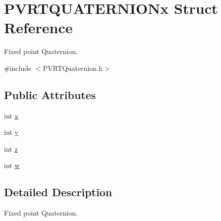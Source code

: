 \hypertarget{struct_p_v_r_t_q_u_a_t_e_r_n_i_o_nx}{\section{P\+V\+R\+T\+Q\+U\+A\+T\+E\+R\+N\+I\+O\+Nx Struct Reference}
\label{struct_p_v_r_t_q_u_a_t_e_r_n_i_o_nx}
}


Fixed point Quaternion.  




{\ttfamily \#include $<$P\+V\+R\+T\+Quaternion.\+h$>$}

\subsection*{Public Attributes}
\begin{DoxyCompactItemize}
\item 
int \hyperlink{struct_p_v_r_t_q_u_a_t_e_r_n_i_o_nx_af3450d5759032c0a58d958f8ab855512}{x}
\item 
int \hyperlink{struct_p_v_r_t_q_u_a_t_e_r_n_i_o_nx_a58e6084d1feeefad2f2348d0d1070afc}{y}
\item 
int \hyperlink{struct_p_v_r_t_q_u_a_t_e_r_n_i_o_nx_af011f90cdefb40164d85c19be4c193ae}{z}
\item 
int \hyperlink{struct_p_v_r_t_q_u_a_t_e_r_n_i_o_nx_af6943db18421e74d91f9abf6de235507}{w}
\end{DoxyCompactItemize}


\subsection{Detailed Description}
Fixed point Quaternion. 



 


